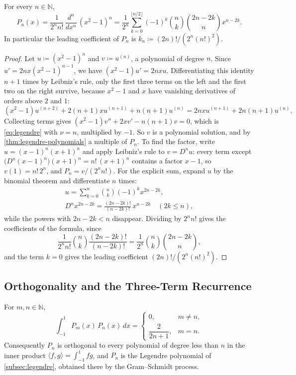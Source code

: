 \begin{theorem}
\label{thm:rodrigues}
For every $n\in\mathbb N$,
\[
P_n(x)=\frac1{2^nn!}\,\frac{d^n}{dx^n}\,(x^2-1)^n=\frac1{2^n}\sum_{k=0}^{\lfloor n/2\rfloor}(-1)^k\binom nk\binom{2n-2k}nx^{n-2k} .
\]
In particular the leading coefficient of $P_n$ is $k_n\coloneqq(2n)!/(2^n(n!)^2)$.
\end{theorem}

\begin{proof}
Let $u\coloneqq(x^2-1)^n$ and $v\coloneqq u^{(n)}$, a polynomial of degree $n$. Since $u'=2nx(x^2-1)^{n-1}$, we have $(x^2-1)u'=2nxu$. Differentiating this identity $n+1$ times by Leibniz's rule, only the first three terms on the left and the first two on the right survive, because $x^2-1$ and $x$ have vanishing derivatives of orders above $2$ and $1$:
\[
(x^2-1)u^{(n+2)}+2(n+1)xu^{(n+1)}+n(n+1)u^{(n)}=2nxu^{(n+1)}+2n(n+1)u^{(n)} .
\]
Collecting terms gives $(x^2-1)v''+2xv'-n(n+1)v=0$, which is \eqref{eq:legendre} with $\nu=n$, multiplied by $-1$. So $v$ is a polynomial solution, and by \cref{thm:legendre-polynomials} a multiple of $P_n$. To find the factor, write $u=(x-1)^n(x+1)^n$ and apply Leibniz's rule to $v=D^n u$: every term except $\bigl(D^n(x-1)^n\bigr)(x+1)^n=n!\,(x+1)^n$ contains a factor $x-1$, so $v(1)=n!\,2^n$, and $P_n=v/(2^nn!)$. For the explicit sum, expand $u$ by the binomial theorem and differentiate $n$ times:
\begin{gather*}
u=\sum_{k=0}^n\binom nk(-1)^kx^{2n-2k},\\
D^nx^{2n-2k}=\frac{(2n-2k)!}{(n-2k)!}\,x^{n-2k}\quad(2k\le n),
\end{gather*}
while the powers with $2n-2k<n$ disappear. Dividing by $2^nn!$ gives the coefficients of the formula, since
\[
\frac1{2^nn!}\binom nk\frac{(2n-2k)!}{(n-2k)!}=\frac1{2^n}\binom nk\binom{2n-2k}n ,
\]
and the term $k=0$ gives the leading coefficient $(2n)!/(2^n(n!)^2)$.
\end{proof}

\subsection{Orthogonality and the Three-Term Recurrence}

\begin{theorem}[Orthogonality]
\label{thm:legendre-orthogonality}
For $m,n\in\mathbb N$,
\[
\int_{-1}^1P_m(x)\,P_n(x)\,dx=\begin{cases}0,&m\ne n,\\[2pt]\dfrac2{2n+1},&m=n .\end{cases}
\]
Consequently $P_n$ is orthogonal to every polynomial of degree less than $n$ in the inner product $\langle f,g\rangle=\int_{-1}^1fg$, and $P_n$ is the Legendre polynomial of \cref{subsec:legendre}, obtained there by the Gram--Schmidt process.
\end{theorem}

